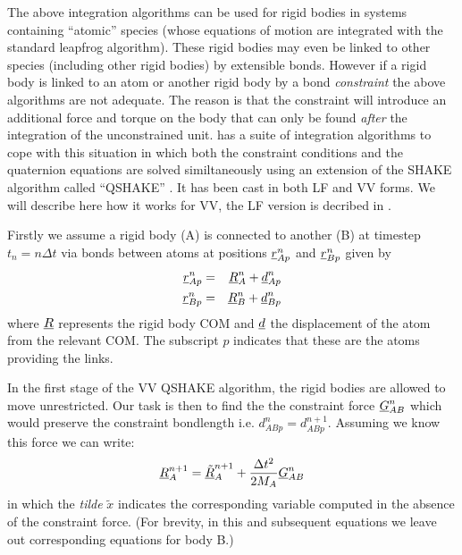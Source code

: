 The above integration algorithms can be used for rigid
bodies in systems containing ``atomic'' species
(whose equations of motion are integrated with the standard leapfrog
algorithm). These rigid bodies may even be linked to
other species (including other rigid bodies) by
extensible bonds. However if a rigid body is linked
to an atom or another rigid body by a bond {\em
constraint} the above algorithms are not
adequate. The reason is that the constraint will introduce an
additional force and torque on the body that can only be found {\em
after} the integration of the unconstrained unit. \D{} has a suite of
integration algorithms to cope with this situation in which both the
constraint conditions and the quaternion equations are solved
similtaneously using an extension of the SHAKE algorithm called
``QSHAKE'' \cite{forester-96a}. It has been
cast in both LF and VV forms. We will describe here how it works for
VV, the LF version is decribed in \cite{forester-96a}.

Firstly we assume a rigid body (A) is connected to another (B) at
timestep $t_n=n\Delta t$ via bonds between atoms at positions
$\mbox{$\underline{r}$}_{Ap}^{n}$ and $\mbox{$\underline{r}$}_{Bp}^{n}$ given by
\begin{eqnarray}
\mbox{$\underline{r}$}_{Ap}^{n}&=&\mbox{$\underline{R}$}_{A}^{n}+\mbox{$\underline{d}$}_{Ap}^{n} \nonumber \\
\mbox{$\underline{r}$}_{Bp}^{n}&=&\mbox{$\underline{R}$}_{B}^{n}+\mbox{$\underline{d}$}_{Bp}^{n}
\end{eqnarray}
where $\mbox{$\underline{R}$}$ represents the rigid body COM and $\mbox{$\underline{d}$}$ the
displacement of the atom from the relevant COM. The subscript $p$
indicates that these are the atoms providing the links.

In the first stage of the VV QSHAKE algorithm, the rigid bodies are allowed
to move unrestricted. Our task is then to find the the constraint
force $\mbox{$\underline{G}$}_{AB}^{n}$ which would preserve the constraint
bondlength i.e. $d_{ABp}^{n}=d_{ABp}^{n+1}$. Assuming we know this
force we can write:
\begin{equation}
\mbox{$\underline{R}$}_{A}^{n+1}=\mbox{$\underline{\tilde{R}}$}_{A}^{n+1}+{\Delta t^2 \over 2M_{A}}
\mbox{$\underline{G}$}_{AB}^{n} \label{move}
\end{equation}
in which the {\em tilde} $\tilde{x}$ indicates the corresponding variable computed
in the absence of the constraint force. (For brevity, in this and subsequent
equations we leave out corresponding equations for body B.)


